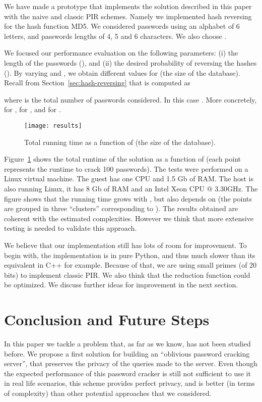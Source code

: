 \documentclass{llncs}
\begin{document}
We have made a prototype that implements the solution described in this paper with
the naive and classic PIR schemes. 
Namely we implemented hash reversing for the hash function MD5. 
We considered passwords using an alphabet  of 6 letters,
and passwords lengths of 4, 5 and 6 characters. We also choose .

We focused our performance evaluation on the following parameters:
(i) the length  of the passwords (), 
and  (ii) the desired probability  of reversing the 
hashes ().
By varying  and , we obtain different values for  
(the size of the database). Recall from Section~\ref{sec:hash-reversing}
that  is computed as

where  is the total number of passwords considered.
In this case .
More concretely,  for ,  for ,
and  for .

\begin{figure}[ht]
\centering
\texttt{[image: results]}
\caption{Total running time as a function of  (the size of the database).}
\label{fig:results}
\end{figure}

Figure~\ref{fig:results} shows the total runtime of the solution 
as a function of  (each point represents the runtime 
to crack 100 passwords).
The tests were performed on a Linux virtual machine. The guest
has one CPU and 1.5 Gb of RAM. The host is also running Linux, it has 8
Gb of RAM and an Intel Xeon CPU @ 3.30GHz.
The figure shows that the running time grows with , but
also depends on  (the points are grouped in three ``clusters''
corresponding to ).
The results obtained are coherent with the estimated complexities.
However we think that more extensive testing is needed to validate
this approach.

We believe that our implementation still has lots of room for improvement.
To begin with, the implementation is in pure Python,
and thus much slower than its equivalent in C++ for example.
Because of that, we are using small primes (of 20 bits) 
to implement classic PIR.
We also think that the reduction function could be optimized. 
We discuss further ideas for improvement in the next section.




\section{Conclusion and Future Steps} \label{sec:conclusion}

In this paper we tackle a problem that, as far as we know,
has not been studied before. We propose a first solution
for building an ``oblivious password cracking server'', 
that preserves the privacy of the queries made to the server.
Even though the expected performance of this password cracker
is still not sufficient to use it in real life scenarios, 
this scheme provides perfect privacy,
and is better (in terms of complexity) than other potential approaches
that we considered.
\end{document}
